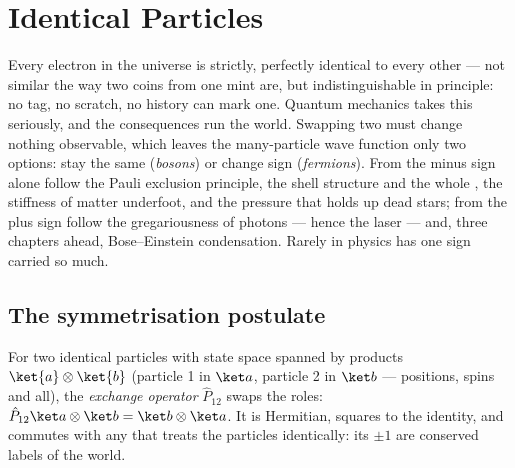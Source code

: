 \chapter{Identical Particles}\label{ch:b3:identical-particles}

Every electron in the universe is strictly, perfectly identical to
every other --- not similar the way two coins from one mint are, but
indistinguishable in principle: no tag, no scratch, no history can
mark one. Quantum mechanics takes this seriously, and the
consequences run the world. Swapping two  must
change nothing observable, which leaves the many-particle wave
function only two options: stay the same (\emph{bosons}) or change
sign (\emph{fermions}). From the minus sign alone follow the Pauli
exclusion principle, the shell structure and the whole , the stiffness of matter underfoot, and the pressure that holds
up dead stars; from the plus sign follow the gregariousness of
photons --- hence the laser --- and, three chapters ahead,
Bose--Einstein condensation. Rarely in physics has one sign carried
so much.

\section{The symmetrisation postulate}

\begin{definition}[Exchange]\label{def:b3:identical-particles:exchange}
For two identical particles with state space spanned by products
$\ket{a}\otimes\ket{b}$ (particle 1 in $\ket a$, particle 2 in
$\ket b$ --- positions, spins and all), the \emph{exchange operator}
$\hat P_{12}$ swaps the roles: $\hat P_{12}\ket a\otimes\ket b =
\ket b\otimes\ket a$. It is Hermitian, squares to the identity, and
commutes with any  that treats the particles identically:
its  $\pm1$ are conserved labels of the world.
\end{definition}

